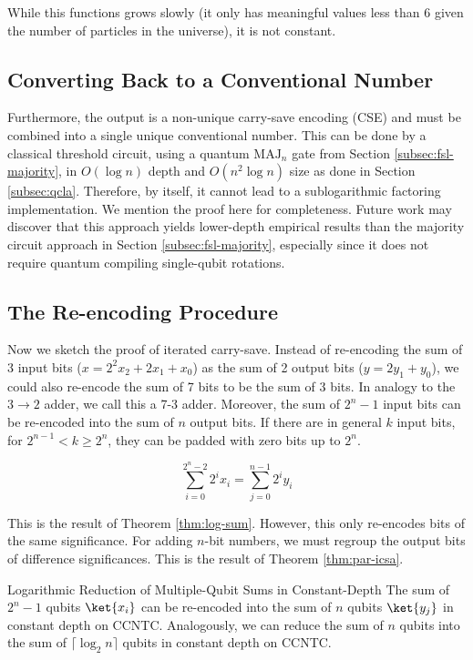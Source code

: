 While this functions grows
slowly (it only has meaningful values less than
$6$ given the number of particles in the universe), it is not
constant.

\subsection{Converting Back to a Conventional Number}
Furthermore, the output is a non-unique carry-save encoding (CSE)
and must be combined into a single unique conventional number.
This can be done by a classical threshold circuit, using a quantum $\text{MAJ}_n$
gate from Section \ref{subsec:fsl-majority},  in
$O(\log n)$ depth and $O(n^2 \log n)$ size as done in Section \ref{subsec:qcla}.
Therefore, by itself, it cannot lead to a sublogarithmic factoring
implementation.
We mention the proof here for completeness. Future work
may discover that this approach yields lower-depth empirical
results than the majority circuit approach in Section \ref{subsec:fsl-majority},
especially since it does not require quantum compiling single-qubit rotations.

\subsection{The Re-encoding Procedure}
Now we sketch the proof of iterated carry-save.
Instead of re-encoding the sum of 3 input bits ($x = 2^2 x_2 + 2 x_1  + x_0$)
as the sum of 2 output bits ($y = 2 y_1 + y_0$),
we could also re-encode the sum of 7 bits to be the
sum of 3 bits. In analogy to the $3 \rightarrow 2$ adder, we call this a 7-3 adder.
Moreover, the sum of $2^n - 1$ input bits can be re-encoded into the sum
of $n$ output bits. If there are in general $k$ input bits, for $2^{n-1} < k \ge 2^n$,
they can be padded with zero bits up to $2^n$.

\begin{equation}
\sum_{i=0}^{2^n - 2} 2^i x_i = \sum_{j=0}^{n-1} 2^i y_i
\end{equation}

This is the result of Theorem \ref{thm:log-sum}.
However, this only re-encodes bits of the same significance. For adding
$n$-bit numbers, we must regroup the output bits of difference
significances. This is the result of Theorem \ref{thm:par-icsa}.

\begin{theorem}{Logarithmic Reduction of Multiple-Qubit Sums in Constant-Depth}
The sum of $2^n -1$ qubits $\ket{x_i}$
can be re-encoded into the sum of $n$ qubits $\ket{y_j}$ in
constant depth on CCNTC. Analogously, we can reduce the sum of
$n$ qubits into the sum of $\lceil \log_2 n \rceil$ qubits in
constant depth on CCNTC.
\label{thm:log-sum}
\end{theorem}

